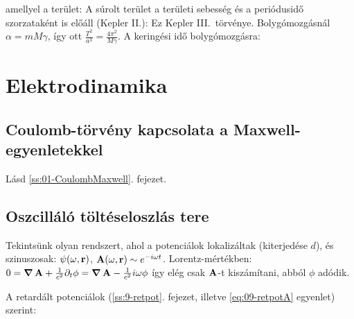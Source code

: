    amellyel a terület:
   A súrolt terület a területi sebesség és a periódusidő szorzataként is előáll (Kepler II{.}):
   Ez Kepler III.\ törvénye. Bolygómozgásnál $\alpha=mM\gamma$, így ott $\frac{T^2}{a^3}=\frac{4\pi^2}{M\gamma}$. A keringési idő bolygómozgásra:
 
 \section{Elektrodinamika} 
  
  \subsection{Coulomb-törvény kapcsolata a Maxwell-egyenletekkel}
   
   Lásd \ref{ss:01-CoulombMaxwell}. fejezet.
   
  \subsection{Oszcilláló töltéseloszlás tere}\label{ss:13-oszcillaloter}
   
   Tekintsünk olyan rendszert, ahol a potenciálok lokalizáltak (kiterjedése $d$), és szinuszosak: $\psi(\omega,\mathbf{r})$, $\mathbf{A}(\omega,\mathbf{r})\sim e^{-i\omega t}$. Lorentz-mértékben: $0=\mathop{\boldsymbol{\nabla}}\nolimits{\mathbf{A}}+\frac{1}{c^2}\partial_t\phi=\mathop{\boldsymbol{\nabla}}\nolimits{\mathbf{A}}-\frac{1}{c^2}i\omega\phi$ így elég csak $\mathbf{A}$-t kiszámítani, abból $\phi$ adódik.
   
   A retardált potenciálok (\ref{ss:9-retpot}. fejezet, illetve \eqref{eq:09-retpotA} egyenlet) szerint:
   
